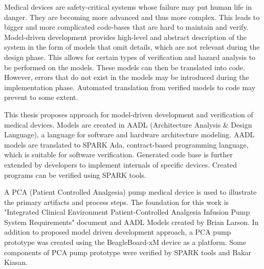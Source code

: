 
\pagestyle{empty}
\setlength{\baselineskip}{0.8cm}

\indent


Medical devices are safety-critical systems whose failure may put human life in danger. They are becoming more advanced and thus more complex. This leads to bigger and more complicated code-bases that are hard to maintain and verify. Model-driven development provides high-level and abstract description of the system in the form of models that omit details, which are not relevant during the design phase. This allows for certain types of verification and hazard analysis to be performed on the models. These models can then be translated into code. However, errors that do not exist in the models may be introduced during the implementation phase. Automated translation from verified models to code may prevent to some extent.

This thesis proposes approach for model-driven development and verification of medical devices. Models are created in AADL (Architecture Analysis \& Design Language), a language for software and hardware architecture modeling. AADL models are translated to SPARK Ada, contract-based programming language, which is suitable for software verification. Generated code base is further extended by developers to implement internals of specific devices. Created programs can be verified using SPARK tools.

A PCA (Patient Controlled Analgesia) pump medical device is used to illustrate the primary artifacts and process steps. The foundation for this work is "Integrated Clinical Environment Patient-Controlled Analgesia Infusion Pump System Requirements" document and AADL Models created by Brian Larson. In addition to proposed model driven development approach, a PCA pump prototype was created using the BeagleBoard-xM device as a platform. Some components of PCA pump prototype were verified by SPARK tools and Bakar Kiasan.
